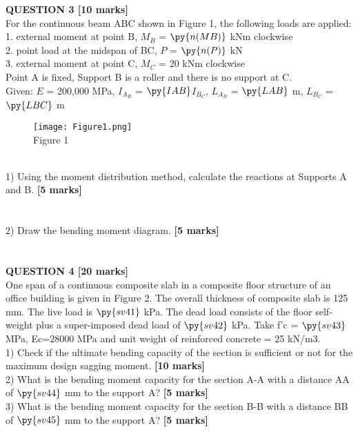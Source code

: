 \documentclass[a4paper,11pt]{article}
\begin{document}
\noindent
\textbf{QUESTION 3 [10 marks]}\\
For the continuous beam ABC shown in Figure 1, the following loads are applied:\\
1. external moment at point B, $M_B$ = $\py{n(MB)}$ kNm clockwise\\
2. point load at the midspan of BC, $P$ = $\py{n(P)}$ kN\\
3. external moment at point C, $M_C$ = 20 kNm clockwise\\
Point A is fixed, Support B is a roller and there is no support at C.\\
Given: $E$ = 200,000 MPa, $I_A_B$ = $\py{IAB}$$I_B_C$, $L_A_B$ = $\py{LAB}$ m, $L_B_C$ = $\py{LBC}$ m\\
\begin{figure}[ht]
\texttt{[image: Figure1.png]}\\
\centering
Figure 1\\
\centering
\end{figure}
\\
1) Using the moment distribution method, calculate the reactions at Supports A and B. \textbf{[5 marks]}
\\
\\
\\
2) Draw the bending moment diagram. \textbf{[5 marks]}
\\
\\
\\
\newpage
\noindent
\textbf{QUESTION 4 [20 marks]}\\
One span of a continuous composite slab in a composite floor structure of an office building is given in Figure 2. The overall thickness of composite slab is 125 mm. The live load is $\py{sv41}$ kPa. The dead load consists of the floor self-weight plus a super-imposed dead load of $\py{sv42}$ kPa. Take f’c = $\py{sv43}$ MPa, Ec=28000 MPa and unit weight of reinforced concrete = 25 kN/m3.\\
1) Check if the ultimate bending capacity of the section is sufficient or not for the maximum design sagging moment. \textbf{[10 marks]}\\
2) What is the bending moment capacity for the section A-A with a distance AA of $\py{sv44}$ mm to the support A? \textbf{[5 marks]}\\
3) What is the bending moment capacity for the section B-B with a distance BB of $\py{sv45}$ mm to the support A? \textbf{[5 marks]}\\
\begin{figure}[ht]

\end{figure}$$
\end{document}
